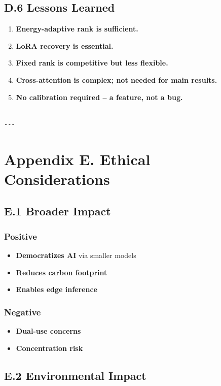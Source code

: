 \subsection{D.6 Lessons Learned}

\begin{enumerate}
\item \textbf{Energy-adaptive rank is sufficient.}
\item \textbf{LoRA recovery is essential.}
\item \textbf{Fixed rank is competitive but less flexible.}
\item \textbf{Cross-attention is complex; not needed for main results.}
\item \textbf{No calibration required -- a feature, not a bug.}
\end{enumerate}
\begin{lstlisting}

---
\end{lstlisting}


\section{Appendix E. Ethical Considerations}

\subsection{E.1 Broader Impact}

\subsubsection{Positive}
\begin{itemize}
\item \textbf{Democratizes AI} via smaller models
\item \textbf{Reduces carbon footprint}
\item \textbf{Enables edge inference}

\end{itemize}
\subsubsection{Negative}
\begin{itemize}
\item \textbf{Dual-use concerns}
\item \textbf{Concentration risk}

\end{itemize}
\subsection{E.2 Environmental Impact}

